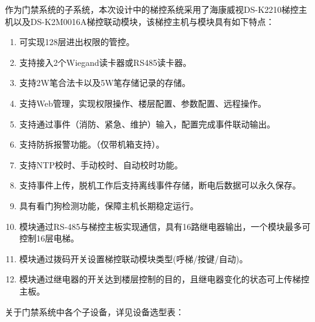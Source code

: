 \documentclass{gdutart}
\begin{document}
      作为门禁系统的子系统，本次设计中的梯控系统采用了海康威视DS-K2210梯控主机以及DS-K2M0016A梯控联动模块，该梯控主机与模块具有如下特点：

      \begin{enumerate}[label={(\arabic*)}]
        \item 可实现128层进出权限的管控。
        \item 支持接入2个Wiegand读卡器或RS485读卡器。
        \item 支持2W笔合法卡以及5W笔存储记录的存储。
        \item 支持Web管理，实现权限操作、楼层配置、参数配置、远程操作。
        \item 支持通过事件（消防、紧急、维护）输入，配置完成事件联动输出。
        \item 支持防拆报警功能。（仅带机箱支持）。
        \item 支持NTP校时、手动校时、自动校时功能。
        \item 支持事件上传，脱机工作后支持离线事件存储，断电后数据可以永久保存。
        \item 具有看门狗检测功能，保障主机长期稳定运行。
        \item 模块通过RS-485与梯控主板实现通信，具有16路继电器输出，一个模块最多可控制16层电梯。
        \item 模块通过拨码开关设置梯控联动模块类型(呼梯/按键/自动)。
        \item 模块通过继电器的开关达到楼层控制的目的，且继电器变化的状态可上传梯控主板。
      \end{enumerate}

      关于门禁系统中各个子设备，详见设备选型表：
\end{document}
